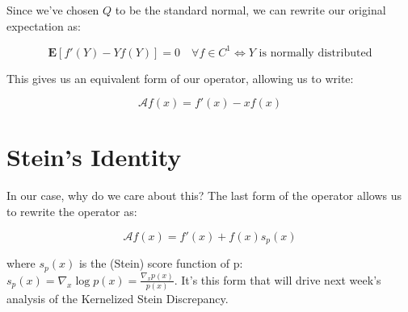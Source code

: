 \documentclass[12pt]{article}
\begin{document}
\noindent Since we've chosen $Q$ to be the standard normal, we can rewrite our original expectation as:

\begin{equation}
    \mathbf{E}[f'(Y) - Yf(Y)] = 0 \quad \forall f \in C^1 \Leftrightarrow Y \text{ is normally distributed}
\end{equation} 

\noindent This gives us an equivalent form of our operator, allowing us to write:

\begin{equation}
    \mathcal{A}f(x) = f'(x) - xf(x)
\end{equation}

\section{Stein's Identity}

In our case, why do we care about this? The last form of the operator allows us to rewrite the operator as:

\begin{equation}
    \mathcal{A}f(x) = f'(x) + f(x)s_p(x)
\end{equation}

where $s_p(x)$ is the (Stein) score function of p: $s_p(x) = \nabla_x \log p(x) = \frac{\nabla_x p(x)}{p(x)}$. It's this form that will drive next week's analysis of the Kernelized Stein Discrepancy. 

%


\end{document}
